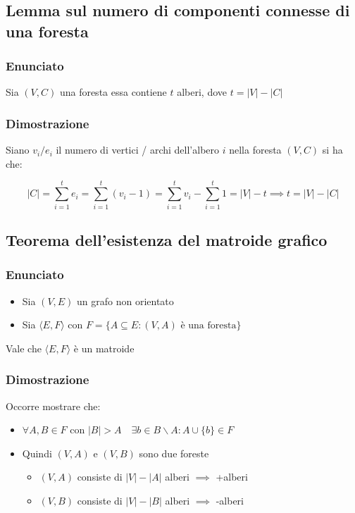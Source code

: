 \subsection{Lemma sul numero di componenti connesse di una foresta}

\subsubsection{Enunciato}
Sia $(V,C)$ una foresta essa contiene $t$ alberi, dove $t = |V| - |C|$

\subsubsection{Dimostrazione}
Siano $v_i / e_i$ il numero di vertici / archi dell'albero $i$ nella foresta $(V,C)$ si ha che:

{
    \large
    $$
    |C| = \sum_{i=1}^{t} e_i = \sum_{i=1}^{t} (v_i - 1) = \sum_{i=1}^{t} v_i - \sum_{i=1}^{t} 1 = |V| - t \implies t = |V| - |C|
    $$
}

\newpage
\subsection{Teorema dell'esistenza del matroide grafico}

\subsubsection{Enunciato}

\begin{itemize}
    \item Sia $(V,E)$ un grafo non orientato
    \item Sia $\langle E,F \rangle$ con $F=\{A \subseteq E : (V,A) \text{ è una foresta}\}$
\end{itemize}

Vale che $\langle E,F \rangle$ è un matroide

\subsubsection{Dimostrazione}
Occorre mostrare che:
\begin{itemize}
    \item $\forall A,B \in F$ con $|B| > A \quad \exists b \in B \backslash A : A \cup \{b\} \in F$
    \item Quindi $(V,A)$ e $(V,B)$ sono due foreste
    \begin{itemize}
        \item $(V,A)$ consiste di $|V|-|A|$ alberi $\implies$ +alberi
        \item $(V,B)$ consiste di $|V|-|B|$ alberi $\implies$ -alberi
    \end{itemize}
\end{itemize}

